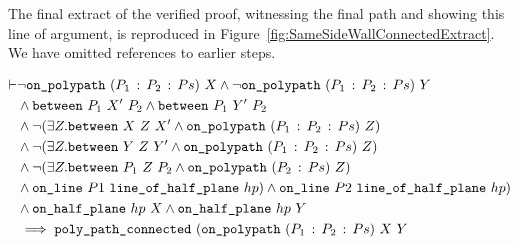 The final extract of the verified proof, witnessing the final path and showing this line of argument, is reproduced in Figure~\ref{fig:SameSideWallConnectedExtract}. We have omitted references to earlier steps.

\begin{equation}
  \label{eq:SameSideWallConnected}
  \begin{split}
\vdash &\neg\texttt{on\_polypath}\ (P_1\,:\,P_2\,:\,Ps)\ X \wedge\neg\texttt{on\_polypath}\ (P_1\,:\,P_2\,:\,Ps)\ Y\\
    &\wedge\texttt{between}\ P_1\ X'\ P_2\wedge\texttt{between}\ P_1\ Y'\ P_2\\
    &\wedge\neg(\exists Z. \texttt{between}\ X\ Z\ X' \wedge \texttt{on\_polypath}\ (P_1\,:\,P_2\,:\,Ps)\ Z)\\
    &\wedge\neg(\exists Z. \texttt{between}\ Y\ Z\ Y' \wedge \texttt{on\_polypath}\ (P_1\,:\,P_2\,:\,Ps)\ Z)\\
    &\wedge\neg(\exists Z. \texttt{between}\ P_1\ Z\ P_2 \wedge \texttt{on\_polypath}\ (P_2\,:\,Ps)\ Z)\\
    &\wedge \texttt{on\_line}\ P1\ \texttt{line\_of\_half\_plane}\ hp) \wedge \texttt{on\_line}\ P2\ \texttt{line\_of\_half\_plane}\ hp)\\
    &\wedge \texttt{on\_half\_plane}\ hp\ X \wedge \texttt{on\_half\_plane}\ hp\ Y\\
    &\implies \texttt{poly\_path\_connected}\ (\texttt{on\_polypath}\ (P_1\,:\,P_2\,:\,Ps)\ X\ Y
  \end{split}
\end{equation}

